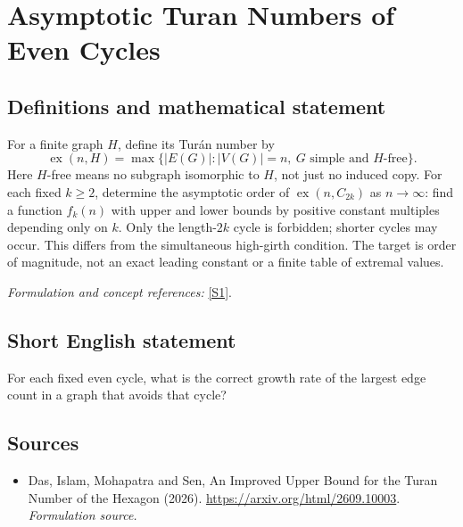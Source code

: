 \documentclass[11pt]{article}
\begin{document}
\section*{\texorpdfstring{Asymptotic Turan Numbers of Even Cycles}{Asymptotic Turan Numbers of Even Cycles}}\label{30006885}
\subsection{Definitions and mathematical statement}
For a finite graph $H$, define its Tur\'an number by
\[
 \operatorname{ex}(n,H)=\max\{|E(G)|:|V(G)|=n,\ G\text{ simple and }H\text{-free}\}.
\]
Here $H$-free means no subgraph isomorphic to $H$, not just no induced copy. For each fixed $k\ge2$, determine the asymptotic order of $\operatorname{ex}(n,C_{2k})$ as $n\to\infty$: find a function $f_k(n)$ with upper and lower bounds by positive constant multiples depending only on $k$. Only the length-$2k$ cycle is forbidden; shorter cycles may occur. This differs from the simultaneous high-girth condition. The target is order of magnitude, not an exact leading constant or a finite table of extremal values.
\par\smallskip\textit{Formulation and concept references:} \href{https://arxiv.org/html/2609.10003}{[S1]}.

\subsection{Short English statement}
For each fixed even cycle, what is the correct growth rate of the largest edge count in a graph that avoids that cycle?
\subsection{Sources}
\begin{itemize}
\item[S1]Das, Islam, Mohapatra and Sen, An Improved Upper Bound for the Turan Number of the Hexagon (2026).
\url{https://arxiv.org/html/2609.10003}.
\textit{Formulation source.}
\end{itemize}
\end{document}
